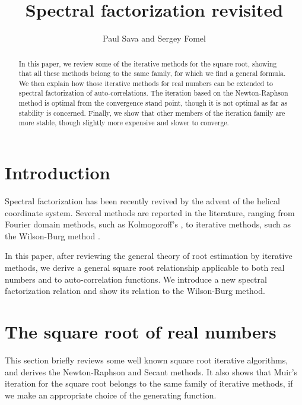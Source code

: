 
\title{Spectral factorization revisited}



\author{Paul Sava and Sergey Fomel}

\maketitle

\begin{abstract}
In this paper, we review some of the iterative methods for the square
root, showing that all these methods belong to the same
family, for which we find a general formula. We then explain how those 
iterative methods for real numbers can be extended to spectral
factorization of auto-correlations. The iteration based on
the Newton-Raphson method is optimal from the convergence stand point, though
it is not optimal as far as stability is concerned. Finally, we show
that other members of the iteration family are more stable, though
slightly more expensive and slower to converge.
\end{abstract}


\section{Introduction}
Spectral factorization has been recently revived by the advent of the
helical coordinate system. Several methods are reported in the
literature, ranging from Fourier domain methods, such as Kolmogoroff's
\cite[]{Claerbout.blackwell.92, kolmog}, to iterative methods, such as the
Wilson-Burg method \cite[]{gee,mywilson,Sava.sep.97.paul1}.
\par
In this paper, after reviewing the general theory of root estimation by
iterative methods, we derive a general square root relationship
applicable to both real numbers and to auto-correlation functions. We
introduce a new spectral factorization relation and show 
its relation to the Wilson-Burg method.

\section{The square root of real numbers}
This section briefly reviews some well known square root iterative
algorithms, and derives the Newton-Raphson and Secant methods. It also
shows that Muir's iteration for the square root \cite[]{Claerbout.bei.95}
belongs to the same family of iterative methods, if we make an
appropriate choice of the generating function.

